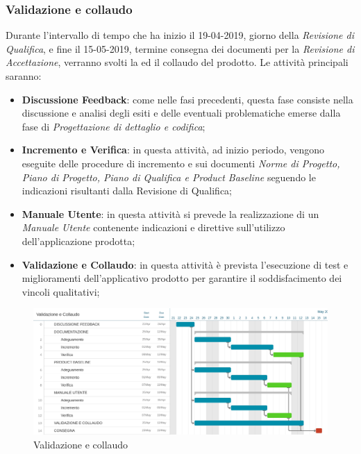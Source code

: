 \subsubsection{Validazione e collaudo}
Durante l'intervallo di tempo che ha inizio il 19-04-2019, giorno della \emph{Revisione di Qualifica}, e fine il 15-05-2019, termine consegna dei documenti per la \emph{Revisione di Accettazione}, verranno svolti la  ed il collaudo del prodotto. Le attività principali saranno:
\begin{itemize}
	\item \textbf{Discussione Feedback}: come nelle fasi precedenti, questa fase consiste nella discussione e analisi degli esiti e delle eventuali problematiche emerse dalla fase di \emph{Progettazione di dettaglio e codifica};
	\item \textbf{Incremento e Verifica}: in questa attività, ad inizio periodo, vengono eseguite delle procedure di incremento e  sui documenti \emph{Norme di Progetto, Piano di Progetto, Piano di Qualifica e Product Baseline} seguendo le indicazioni risultanti dalla Revisione di Qualifica;
	\item \textbf{Manuale Utente}: in questa attività si prevede la realizzazione di un \emph{Manuale Utente} contenente indicazioni e direttive sull'utilizzo dell'applicazione prodotta;
	\item \textbf{Validazione e Collaudo}: in questa attività è prevista l'esecuzione di test e miglioramenti dell'applicativo prodotto per garantire il soddisfacimento dei vincoli qualitativi;
\end{itemize}
\begin{figure}[htbp]
	\centering
	\includegraphics[width=15cm,keepaspectratio]{../includes/pics/grafici/Gantt_validazione_collaudo.jpeg}
	\caption{\label{fig:mission} Validazione e collaudo}
\end{figure}
